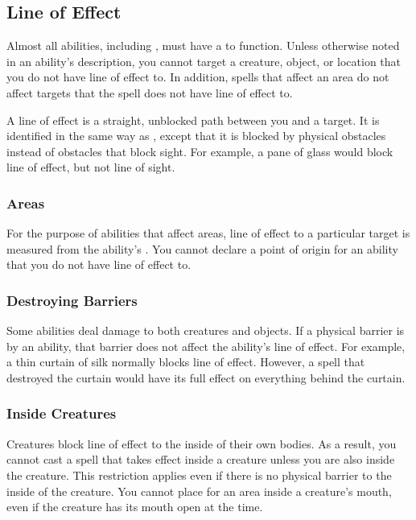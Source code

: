     \subsection{Line of Effect}\label{Line of Effect}

        Almost all abilities, including , must have a  to function.
        Unless otherwise noted in an ability's description, you cannot target a creature, object, or location that you do not have line of effect to.
        In addition, spells that affect an area do not affect targets that the spell does not have line of effect to.

        A line of effect is a straight, unblocked path between you and a target.
        It is identified in the same way as , except that it is blocked by physical obstacles instead of obstacles that block sight.
        For example, a pane of glass would block line of effect, but not line of sight.

        \subsubsection{Areas}
            For the purpose of abilities that affect areas, line of effect to a particular target is measured from the ability's .
            You cannot declare a point of origin for an ability that you do not have line of effect to.

        \subsubsection{Destroying Barriers}\label{Destroying Barriers}
            Some abilities deal damage to both creatures and objects.
            If a physical barrier is  by an ability, that barrier does not affect the ability's line of effect.
            For example, a thin curtain of silk normally blocks line of effect.
            However, a spell that destroyed the curtain would have its full effect on everything behind the curtain.

        \subsubsection{Inside Creatures}
            Creatures block line of effect to the inside of their own bodies.
            As a result, you cannot cast a spell that takes effect inside a creature unless you are also inside the creature.
            This restriction applies even if there is no physical barrier to the inside of the creature.
            You cannot place  for an area inside a creature's mouth, even if the creature has its mouth open at the time.

